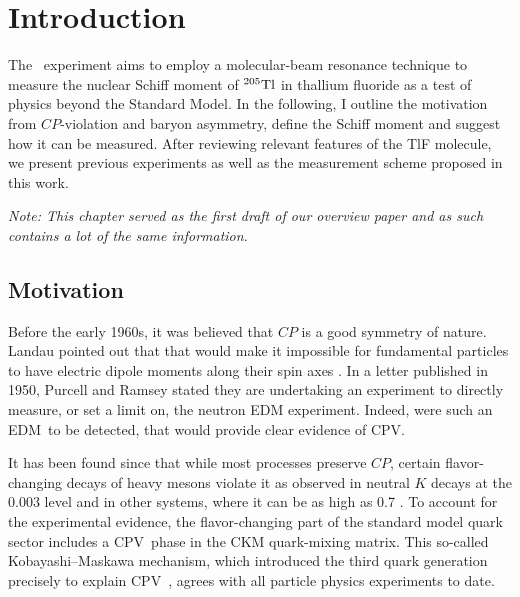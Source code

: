 \section{Introduction}

\noindent The \CENTREX\ experiment aims to employ a molecular-beam resonance
technique to measure the nuclear Schiff moment of $^{205}\mathrm{Tl}$ in thallium
fluoride as a test of physics beyond the Standard Model. In the following, I
outline the motivation from $CP$-violation and baryon asymmetry, define the
Schiff moment and suggest how it can be measured. After reviewing relevant
features of the TlF molecule, we present previous experiments as well as the
measurement scheme proposed in this work.

\textit{Note: This chapter served as the first draft of our overview paper
\cite{grasdijk2021centrex} and as such contains a lot of the same information.}

\subsection{Motivation}

Before the early 1960s, it was believed that $CP$ is a good symmetry of nature.
Landau pointed out that that would make it impossible for fundamental particles
to have electric dipole moments along their spin axes
\cite{landau1957conservation}. In a letter published in 1950, Purcell and Ramsey
\cite{purcell1950possibility} stated they are undertaking an experiment to
directly measure, or set a limit on, the neutron \gls{EDM} experiment. Indeed,
were such an \gls{EDM}\ to be detected, that would provide clear evidence of
\gls{CPV}.

It has been found since that while most processes preserve $CP$, certain
flavor-changing decays of heavy mesons violate it as observed in neutral $K$
decays at the 0.003 level \cite{christenson1964evidence} and in other systems,
where it can be as high as 0.7 \cite[chapter 13]{PDG16}. To account for the
experimental evidence, the flavor-changing part of the standard model quark
sector includes a \gls{CPV}\ phase in the \gls{CKM} quark-mixing matrix.
\cite{peccei1995} This so-called Kobayashi--Maskawa mechanism, which introduced
the third quark generation precisely to explain \gls{CPV}\
\cite{kobayashi1973cp}, agrees with all particle physics experiments to date.
\cite{hou2011source}

